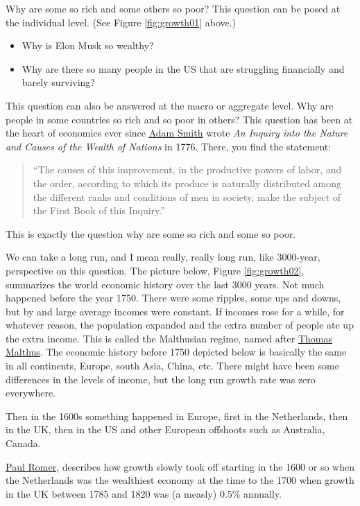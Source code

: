 \documentclass[
]{book}
\providecommand{\tightlist}{%
  \setlength{\itemsep}{0pt}\setlength{\parskip}{0pt}}
\begin{document}
Why are some so rich and some others so poor? This question can be posed at the individual level. (See Figure \ref{fig:growth01} above.)

\begin{itemize}
\tightlist
\item
  Why is Elon Musk so wealthy?
\item
  Why are there so many people in the US that are struggling financially and barely surviving?
\end{itemize}

This question can also be answered at the macro or aggregate level. Why are people in some countries so rich and so poor in others? This question has been at the heart of economics ever since \href{https://en.wikipedia.org/wiki/Adam_Smith}{Adam Smith} wrote \emph{An Inquiry into the Nature and Causes of the Wealth of Nations} in 1776. There, you find the statement:

\begin{quote}
``The causes of this improvement, in the productive powers of labor, and the order, according to which its produce is naturally distributed among the different ranks and conditions of men in society, make the subject of the First Book of this Inquiry.''
\end{quote}

This is exactly the question why are some so rich and some so poor.

We can take a long run, and I mean really, really long run, like 3000-year, perspective on this question. The picture below, Figure \ref{fig:growth02}, summarizes the world economic history over the last 3000 years. Not much happened before the year 1750. There were some ripples, some ups and downs, but by and large average incomes were constant. If incomes rose for a while, for whatever reason, the population expanded and the extra number of people ate up the extra income. This is called the Malthusian regime, named after \href{https://en.wikipedia.org/wiki/Thomas_Robert_Malthus}{Thomas Malthus}. The economic history before 1750 depicted below is basically the same in all continents, Europe, south Asia, China, etc. There might have been some differences in the levels of income, but the long run growth rate was zero everywhere.

Then in the 1600s something happened in Europe, first in the Netherlands, then in the UK, then in the US and other European offshoots such as Australia, Canada.

\href{https://en.wikipedia.org/wiki/Paul_Romer}{Paul Romer}, describes how growth slowly took off starting in the 1600 or so when the Netherlands was the wealthiest economy at the time to the 1700 when growth in the UK between 1785 and 1820 was (a measly) 0.5\% annually.
\end{document}

